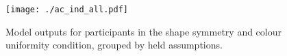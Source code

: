 \documentclass[man, 12pt, a4paper,  donotrepeattitle, floatsintext, draftfirst]{apa7}
\begin{document}

\begin{figure}[htb]
    \caption{Model outputs for participants in the shape symmetry and colour uniformity condition, grouped by held assumptions.}
    \centering
    \texttt{[image: ./ac\_ind\_all.pdf]}
    \label{fig:ac_all}
\end{figure}
\vfill
\end{document}
